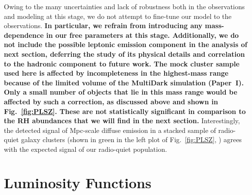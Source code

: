 \documentclass[useAMS,usenatbib]{mn2e}
\begin{document}
Owing to the many uncertainties and lack of robustness both in the observations
and modeling at this stage, we do not attempt to fine-tune our model to the
observations. {\bf In particular, we refrain from introducing any
  mass-dependence in our free parameters at this stage.  Additionally, we do not
  include the possible leptonic emission component in the analysis of next
  section, deferring the study of its physical details and correlation to the
  hadronic component to future work.  The mock cluster sample used here is
  affected by incompleteness in the highest-mass range because of the limited
  volume of the MultiDark simulation (Paper~I). Only a small number of objects
  that lie in this mass range would be affected by such a correction, as
  discussed above and shown in Fig.~\ref{fig:PLSZ}. These are not statistically
  significant in comparison to the RH abundances that we will find in the next
  section.}  Interestingly, the detected signal of Mpc-scale diffuse emission in
a stacked sample of radio-quiet galaxy clusters (shown in green in the left plot
of Fig.~\ref{fig:PLSZ}, \citealp{2011ApJ...740L..28B}) agrees with the expected
signal of our radio-quiet population.



\section{Luminosity Functions}
\label{sec:5}
\end{document}
